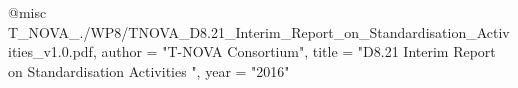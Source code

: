 @misc{ T_NOVA_./WP8/TNOVA_D8.21_Interim_Report_on_Standardisation_Activities_v1.0.pdf,
       author = "T-NOVA Consortium",
       title = "D8.21 Interim Report on Standardisation Activities ",
       year = "2016" }
